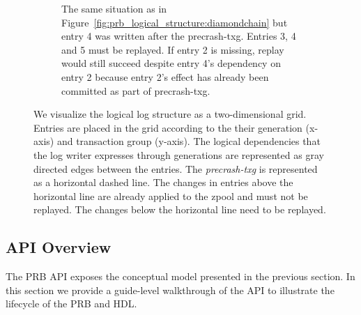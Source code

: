 \documentclass[12pt,a4paper,twoside]{book}
\begin{document}
\begin{figure}[H]
\begin{subfigure}{\textwidth}
        \caption{
            The same situation as in Figure~\ref{fig:prb_logical_structure:diamondchain} but entry 4 was written after the precrash-txg.
            Entries 3, 4 and 5 must be replayed.
            If entry 2 is missing, replay would still succeed despite entry 4's dependency on entry 2 because entry 2's effect has already been committed as part of precrash-txg.
            }
        \label{fig:prb_logical_structure:diamondchain2}
    \end{subfigure}
    \caption{
        We visualize the logical log structure as a two-dimensional grid.
        Entries are placed in the grid according to the their generation (x-axis) and transaction group (y-axis).
        The logical dependencies that the log writer expresses through generations are represented as gray directed edges between the entries.
        The \textit{precrash-txg} is represented as a horizontal dashed line.
        The changes in entries above the horizontal line are already applied to the zpool and must not be replayed.
        The changes below the horizontal line need to be replayed.
    }
    \label{fig:prb_logical_structure}
\end{figure}



\subsection{API Overview}\label{di:prb:api} %
The PRB API exposes the conceptual model presented in the previous section.
In this section we provide a guide-level walkthrough of the API to illustrate the lifecycle of the PRB and HDL.
\end{document}
